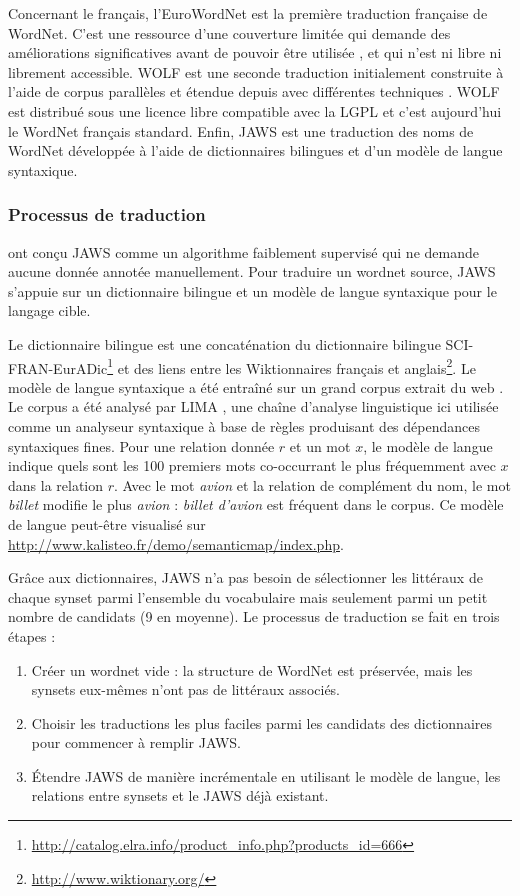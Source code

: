 Concernant le français, l'EuroWordNet \citep{vossen1998eurowordnet} est la
première traduction française de WordNet. C'est une ressource d'une couverture
limitée qui demande des améliorations significatives avant de pouvoir être
utilisée \citep{jacquin2006systemes}, et qui n'est ni libre ni librement
accessible. WOLF est une seconde traduction initialement construite à l'aide de
corpus parallèles \citep{sagot2008construction} et étendue depuis avec
différentes techniques \citep{apidianaki2012applying}. WOLF est distribué sous
une licence libre compatible avec la LGPL et c'est aujourd'hui le WordNet
français standard. Enfin, JAWS \citep{mouton2010jaws} est une traduction des
noms de WordNet développée à l'aide de dictionnaires bilingues et d'un modèle
de langue syntaxique.

\subsubsection{Processus de traduction}
\label{subsec:translation_process}

\cite{mouton2010jaws} ont conçu JAWS comme un algorithme faiblement supervisé
qui ne demande aucune donnée annotée manuellement. Pour traduire un wordnet
source, JAWS s'appuie sur un dictionnaire bilingue et un modèle de langue
syntaxique pour le langage cible.

Le dictionnaire bilingue est une concaténation du dictionnaire bilingue
SCI-FRAN-EurADic\footnote{\url{http://catalog.elra.info/product_info.php?products_id=666}}
et des liens entre les Wiktionnaires français et
anglais\footnote{\url{http://www.wiktionary.org/}}. Le modèle de langue
syntaxique a été entraîné sur un grand corpus extrait du web
\citep{grefenstette2007conquering}. Le corpus a été analysé par LIMA
\citep{besancon2010lima}, une chaîne d'analyse linguistique ici utilisée comme
un analyseur syntaxique à base de règles produisant des dépendances syntaxiques
fines. Pour une relation donnée $r$ et un mot $x$, le modèle de langue indique
quels sont les 100 premiers mots co-occurrant le plus fréquemment avec $x$ dans
la relation $r$. Avec le mot \textit{avion} et la relation de complément du
nom, le mot \textit{billet} modifie le plus \textit{avion} : \textit{billet
d'avion} est fréquent dans le corpus. Ce modèle de langue peut-être visualisé
sur \url{http://www.kalisteo.fr/demo/semanticmap/index.php}.

Grâce aux dictionnaires, JAWS n'a pas besoin de sélectionner les littéraux de chaque synset parmi l'ensemble du vocabulaire mais seulement parmi un petit nombre de candidats (9 en moyenne). Le processus de traduction se fait en trois étapes :
\begin{enumerate}
    \item Créer un wordnet vide : la structure de WordNet est préservée, mais les synsets eux-mêmes n'ont pas de littéraux associés.
    \item Choisir les traductions les plus faciles parmi les candidats des dictionnaires pour commencer à remplir JAWS.
    \item Étendre JAWS de manière incrémentale en utilisant le modèle de langue, les relations entre synsets et le JAWS déjà existant.
\end{enumerate}

